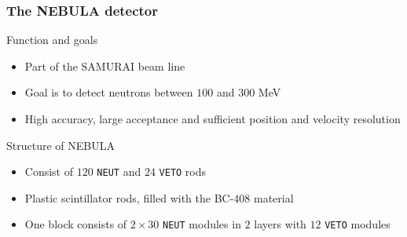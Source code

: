 \begin{frame}
\frametitle{The NEBULA detector}

\begin{alertblock}{Function and goals}
	\begin{itemize}
		\item Part of the SAMURAI beam line
		\item Goal is to detect neutrons between $100$ and $300$ MeV
		\item High accuracy, large acceptance and sufficient position and velocity resolution
	\end{itemize}
\end{alertblock}

\pause

\begin{block}{Structure of NEBULA}
	\begin{itemize}
		\item Consist of $120$ \texttt{NEUT} and $24$ \texttt{VETO} rods
		\item Plastic scintillator rods, filled with the BC-$408$ material
		\item One block consists of $2 \times 30$ \texttt{NEUT} modules in $2$ layers with $12$ \texttt{VETO} modules
	\end{itemize}
\end{block}

\end{frame}